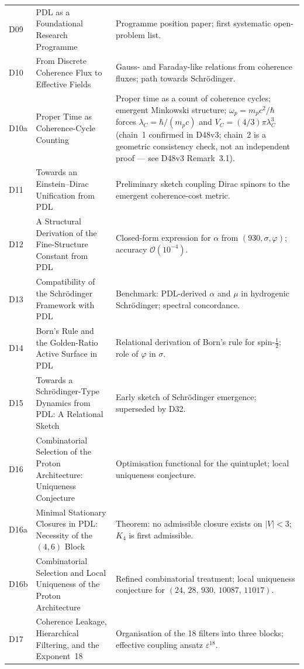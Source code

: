 \documentclass[11pt,a4paper]{article}
\theoremstyle{plain}
\theoremstyle{definition}
\theoremstyle{remark}
\newcommand{\quintuplet}{(24,\,28,\,930,\,10087,\,11017)}
\begin{document}
\begin{longtable}{L{1.3cm}L{3.8cm}L{8.0cm}}
D09 & PDL as a Foundational Research Programme~\cite{D09} & Programme position paper; first systematic open-problem list.\\[0.3em]
D10 & From Discrete Coherence Flux to Effective Fields~\cite{D10} & Gauss- and Faraday-like relations from coherence fluxes; path towards Schr\"odinger.\\[0.3em]
D10a & Proper Time as Coherence-Cycle Counting~\cite{D10a} & Proper time as a count of coherence cycles; emergent Minkowski structure; $\omega_p = m_p c^2/\hbar$ forces $\lambda_C = \hbar/(m_p c)$ and $V_C = (4/3)\pi\lambda_C^3$ (chain~1 confirmed in D48v3; chain~2 is a geometric consistency check, not an independent proof --- see D48v3 Remark~3.1).\\[0.3em]
D11 & Towards an Einstein--Dirac Unification from PDL~\cite{D11} & Preliminary sketch coupling Dirac spinors to the emergent coherence-cost metric.\\[0.3em]
D12 & A Structural Derivation of the Fine-Structure Constant from PDL~\cite{D12} & Closed-form expression for $\alpha$ from $(930, \sigma, \varphi)$; accuracy $\mathcal{O}(10^{-4})$.\\[0.3em]
D13 & Compatibility of the Schr\"odinger Framework with PDL~\cite{D13} & Benchmark: PDL-derived $\alpha$ and $\mu$ in hydrogenic Schr\"odinger; spectral concordance.\\[0.3em]
D14 & Born's Rule and the Golden-Ratio Active Surface in PDL~\cite{D14} & Relational derivation of Born's rule for spin-$\tfrac{1}{2}$; role of $\varphi$ in $\sigma$.\\[0.3em]
D15 & Towards a Schr\"odinger-Type Dynamics from PDL: A Relational Sketch~\cite{D15} & Early sketch of Schr\"odinger emergence; superseded by D32.\\[0.3em]
D16 & Combinatorial Selection of the Proton Architecture: Uniqueness Conjecture~\cite{D16} & Optimisation functional for the quintuplet; local uniqueness conjecture.\\[0.3em]
D16a & Minimal Stationary Closures in PDL: Necessity of the $(4,6)$ Block~\cite{D16a} & \textcolor{proofblue}{Theorem}: no admissible closure exists on $|V|<3$; $K_4$ is first admissible.\\[0.3em]
D16b & Combinatorial Selection and Local Uniqueness of the Proton Architecture~\cite{D16b} & Refined combinatorial treatment; local uniqueness conjecture for $\quintuplet$.\\[0.3em]
D17 & Coherence Leakage, Hierarchical Filtering, and the Exponent~18~\cite{D17} & Organisation of the 18 filters into three blocks; effective coupling ansatz $\varepsilon^{18}$.\\[0.3em]

\end{longtable}
\end{document}
